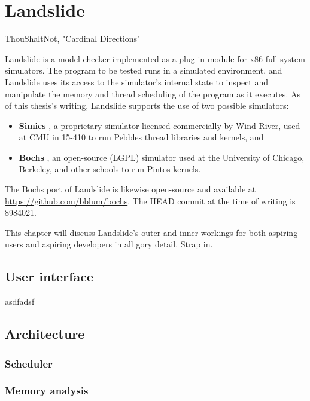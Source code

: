 \chapter{Landslide}
{ThouShaltNot, "Cardinal Directions"}

Landslide is a model checker implemented as a plug-in module for x86 full-system simulators.
The program to be tested runs in a simulated environment,
and Landslide uses its access to the simulator's internal state to inspect and manipulate the memory and thread scheduling of the program as it executes.
As of this thesis's writing, Landslide supports the use of two possible simulators:

\begin{itemize}
	\item {\bf Simics} \cite{simics}, a proprietary simulator licensed commercially by Wind River, used at CMU in 15-410 to run Pebbles thread libraries and kernels, and
	\item {\bf Bochs} \cite{bochs}, an open-source (LGPL) simulator used at the University of Chicago, Berkeley, and other schools to run Pintos kernels.
\end{itemize}

The Bochs port of Landslide is likewise open-source and available at \url{https://github.com/bblum/bochs}.
The HEAD commit at the time of writing is 8984021.

This chapter will discuss Landslide's outer and inner workings for both aspiring users and aspiring developers in all gory detail. Strap in.

\section{User interface}

asdfadsf

\section{Architecture}

\subsection{Scheduler}
\subsection{Memory analysis}
